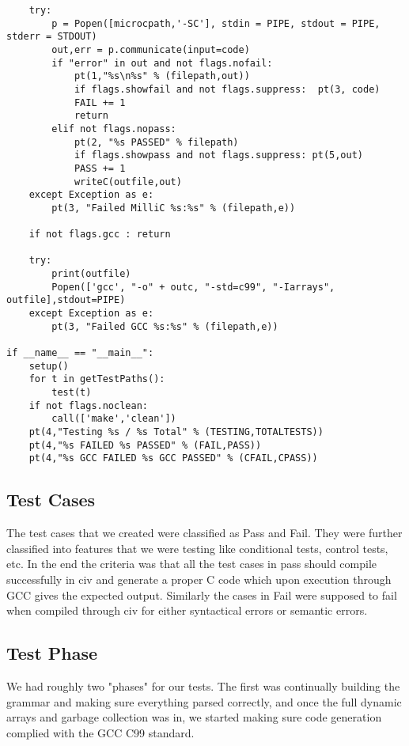 \documentclass[a4paper]{article}
\begin{document}
\begin{verbatim}
    try:
        p = Popen([microcpath,'-SC'], stdin = PIPE, stdout = PIPE, stderr = STDOUT)
        out,err = p.communicate(input=code)
        if "error" in out and not flags.nofail:
            pt(1,"%s\n%s" % (filepath,out))
            if flags.showfail and not flags.suppress:  pt(3, code)
            FAIL += 1
            return
        elif not flags.nopass:
            pt(2, "%s PASSED" % filepath)
            if flags.showpass and not flags.suppress: pt(5,out)
            PASS += 1
            writeC(outfile,out)
    except Exception as e:
        pt(3, "Failed MilliC %s:%s" % (filepath,e))

    if not flags.gcc : return

    try:
        print(outfile)
        Popen(['gcc', "-o" + outc, "-std=c99", "-Iarrays", outfile],stdout=PIPE)
    except Exception as e:
        pt(3, "Failed GCC %s:%s" % (filepath,e))

if __name__ == "__main__":
    setup()
    for t in getTestPaths():
        test(t)
    if not flags.noclean:
        call(['make','clean'])
    pt(4,"Testing %s / %s Total" % (TESTING,TOTALTESTS))
    pt(4,"%s FAILED %s PASSED" % (FAIL,PASS))
    pt(4,"%s GCC FAILED %s GCC PASSED" % (CFAIL,CPASS))

\end{verbatim}
\normalsize
\subsection{Test Cases}

The test cases that we created were classified as Pass and Fail. They were further classified into features that we were testing like conditional tests, control tests, etc.  In the end the criteria was that all the test cases in pass should compile successfully in civ and generate a proper C code which upon execution through GCC gives the expected output. Similarly the cases in Fail were supposed to fail when compiled through civ for either syntactical errors or semantic errors.
\subsection{Test Phase}
We had roughly two "phases" for our tests. The first was continually building the grammar and making sure everything parsed correctly, and once the full dynamic arrays and garbage collection was in, we started making sure code generation complied with the GCC C99 standard. 
\end{document}

